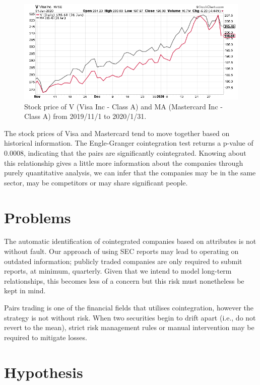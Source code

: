 \documentclass{UoYCSproject}
\begin{document}
\begin{figure}[h]
\begin{center}
\includegraphics[trim=0 0 0 15, clip, width=\linewidth]{"./images/VMA"}
\end{center}
\caption{Stock price of V (Visa Inc - Class A) and MA (Mastercard Inc - Class A) from 2019/11/1 to 2020/1/31.}
\end{figure}

The stock prices of Visa and Mastercard tend to move together based on historical information. The Engle-Granger cointegration test returns a p-value of 0.0008, indicating that the pairs are significantly cointegrated. Knowing about this relationship gives a little more information about the companies through purely quantitative analysis, we can infer that the companies may be in the same sector, may be competitors or may share significant people.

\section{Problems}

The automatic identification of cointegrated companies based on attributes is not without fault. Our approach of using SEC reports may lead to operating on outdated information; publicly traded companies are only required to submit reports, at minimum, quarterly. Given that we intend to model long-term relationships, this becomes less of a concern but this risk must nonetheless be kept in mind.

Pairs trading is one of the financial fields that utilises cointegration, however the strategy is not without risk. When two securities begin to drift apart (i.e., do not revert to the mean), strict risk management rules or manual intervention may be required to mitigate losses.

\section{Hypothesis}
\end{document}
